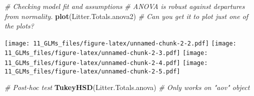 \documentclass[
]{article}
\newenvironment{Shaded}{\begin{snugshade}}{\end{snugshade}}
\newcommand{\CommentTok}[1]{\textcolor[rgb]{0.56,0.35,0.01}{\textit{#1}}}
\newcommand{\KeywordTok}[1]{\textcolor[rgb]{0.13,0.29,0.53}{\textbf{#1}}}
\newcommand{\NormalTok}[1]{#1}
\begin{document}
\begin{Shaded}
\begin{Highlighting}[]
\CommentTok{# Checking model fit and assumptions}
\CommentTok{# ANOVA is robust against departures from normality.}
\KeywordTok{plot}\NormalTok{(Litter.Totals.anova2) }\CommentTok{# Can you get it to plot just one of the plots?}
\end{Highlighting}
\end{Shaded}

\texttt{[image: 11\_GLMs\_files/figure-latex/unnamed-chunk-2-2.pdf]}
\texttt{[image: 11\_GLMs\_files/figure-latex/unnamed-chunk-2-3.pdf]}
\texttt{[image: 11\_GLMs\_files/figure-latex/unnamed-chunk-2-4.pdf]}
\texttt{[image: 11\_GLMs\_files/figure-latex/unnamed-chunk-2-5.pdf]}

\begin{Shaded}
\begin{Highlighting}[]
\CommentTok{# Post-hoc test}
\KeywordTok{TukeyHSD}\NormalTok{(Litter.Totals.anova) }\CommentTok{# Only works on "aov" object}
\end{Highlighting}
\end{Shaded}
\end{document}

